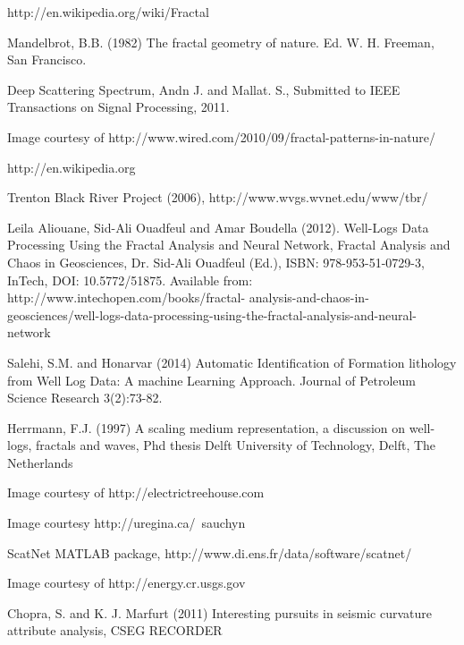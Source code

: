 \documentclass[journal]{IEEEtran}
\begin{document}
\begin{thebibliography}{1}

http://en.wikipedia.org/wiki/Fractal

Mandelbrot, B.B. (1982) The fractal geometry of nature. Ed. W. H. Freeman, San Francisco.

Deep Scattering Spectrum, Andn J. and Mallat. S., Submitted to IEEE Transactions on Signal Processing, 2011. 

Image courtesy of http://www.wired.com/2010/09/fractal-patterns-in-nature/

http://en.wikipedia.org

Trenton Black River Project (2006), http://www.wvgs.wvnet.edu/www/tbr/


Leila Aliouane, Sid-Ali Ouadfeul and Amar Boudella (2012). Well-Logs Data Processing Using the Fractal Analysis and Neural Network, Fractal Analysis and Chaos in Geosciences, Dr. Sid-Ali Ouadfeul (Ed.), ISBN: 978-953-51-0729-3, InTech, DOI: 10.5772/51875. Available from: http://www.intechopen.com/books/fractal- analysis-and-chaos-in-geosciences/well-logs-data-processing-using-the-fractal-analysis-and-neural-network
  
Salehi, S.M. and Honarvar (2014) Automatic Identification of Formation lithology from Well Log Data: A machine Learning Approach. Journal of Petroleum Science Research 3(2):73-82.

Herrmann, F.J. (1997) A scaling medium representation, a discussion on well-logs, fractals and waves, Phd thesis Delft University of Technology, Delft, The Netherlands

Image courtesy of http://electrictreehouse.com

Image courtesy http://uregina.ca/~sauchyn

ScatNet MATLAB package, http://www.di.ens.fr/data/software/scatnet/


Image courtesy of http://energy.cr.usgs.gov

Chopra, S. and K. J.  Marfurt (2011) Interesting pursuits in seismic curvature attribute analysis, CSEG RECORDER
\end{thebibliography}



\end{document}
